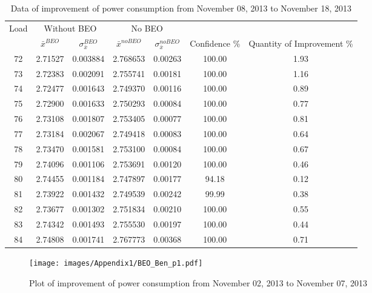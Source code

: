 \begin{table}[H]
\scriptsize
  \begin{center}
    \begin{tabular}{c c c c c c c}
    \toprule
    \multirow{2}{*}{Load} & \multicolumn{2}{c}{Without BEO} & \multicolumn{2}{c}{No BEO} & \\[0.2cm]
    \cmidrule{2-7}
     & $\bar{x}^{BEO}$ & $\sigma_{\bar{x}}^{BEO}$ & $\bar{x}^{noBEO}$ & $\sigma_{\bar{x}}^{noBEO}$ & Confidence \% & Quantity of Improvement \%\\
    \midrule
	72 & 2.71527 & 0.003884 & 2.768653 & 0.00263 & 100.00 & 1.93\\
	73 & 2.72383 & 0.002091 & 2.755741 & 0.00181 & 100.00 & 1.16\\
	74 & 2.72477 & 0.001643 & 2.749370 & 0.00116 & 100.00 & 0.89\\
	75 & 2.72900 & 0.001633 & 2.750293 & 0.00084 & 100.00 & 0.77\\
	76 & 2.73108 & 0.001807 & 2.753405 & 0.00077 & 100.00 & 0.81\\
	77 & 2.73184 & 0.002067 & 2.749418 & 0.00083 & 100.00 & 0.64\\
	78 & 2.73470 & 0.001581 & 2.753100 & 0.00084 & 100.00 & 0.67\\
	79 & 2.74096 & 0.001106 & 2.753691 & 0.00120 & 100.00 & 0.46\\
	80 & 2.74455 & 0.001184 & 2.747897 & 0.00177 & 94.18 & 0.12\\
	81 & 2.73922 & 0.001432 & 2.749539 & 0.00242 & 99.99 & 0.38\\
	82 & 2.73677 & 0.001302 & 2.751834 & 0.00210 & 100.00 & 0.55\\
	83 & 2.74342 & 0.001493 & 2.755530 & 0.00197 & 100.00 & 0.44\\
	84 & 2.74808 & 0.001741 & 2.767773 & 0.00368 & 100.00 & 0.71\\
	\bottomrule
	\end{tabular}
    \caption{Data of improvement of power consumption from November 08, 2013 to November 18, 2013}
    \label{App:table03} 
  \end{center} 
\end{table}

\begin{figure}[H]
  \centering
  \texttt{[image: images/Appendix1/BEO\_Ben\_p1.pdf]}
  \caption{Plot of improvement of power consumption from November 02, 2013 to November 07, 2013}
  \label{App:fig03}    
\end{figure}

